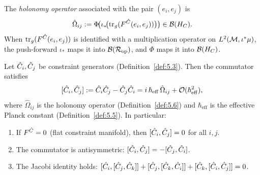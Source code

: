 \begin{definition}
\label{def:5.6}
The \emph{holonomy operator} associated with the pair $(e_i, e_j)$ is
\[
  \hat\Omega_{ij} := \Phi\!\bigl(
    \iota_*\!\bigl(\mathrm{tr}_g(F^{\hat{C}}(e_i, e_j))\bigr)
  \bigr) \in \mathcal{B}(H_C).
\]
When $\mathrm{tr}_g(F^{\hat{C}}(e_i, e_j))$ is identified with a
multiplication operator on $L^2(\mathcal{M}, \iota^*\mu)$, the push-forward
$\iota_*$ maps it into $\mathcal{B}(\mathcal{R}_{\mathrm{op}})$, and $\Phi$ maps it
into $\mathcal{B}(H_C)$.
\end{definition}

\begin{theorem}
\label{thm:5.1}
Let $\hat{C}_i, \hat{C}_j$ be constraint generators
\textup{(}Definition~\textup{\ref{def:5.3})}.  Then the commutator
satisfies
\[
  [\hat{C}_i, \hat{C}_j]
  := \hat{C}_i \hat{C}_j - \hat{C}_j \hat{C}_i
  = i\,\hbar_{\mathrm{eff}}\,\hat\Omega_{ij}
    + \mathcal{O}(\hbar_{\mathrm{eff}}^2),
\]
where $\hat\Omega_{ij}$ is the holonomy operator
\textup{(}Definition~\textup{\ref{def:5.6})} and
$\hbar_{\mathrm{eff}}$ is the effective Planck constant
\textup{(}Definition~\textup{\ref{def:5.5})}.  In particular:
\begin{enumerate}
  \item[\textup{(CR1)}] If $F^{\hat{C}} = 0$ \textup{(}flat constraint
    manifold\textup{)}, then $[\hat{C}_i, \hat{C}_j] = 0$ for all $i, j$.
  \item[\textup{(CR2)}] The commutator is antisymmetric:
    $[\hat{C}_i, \hat{C}_j] = -[\hat{C}_j, \hat{C}_i]$.
  \item[\textup{(CR3)}] The Jacobi identity holds:
    $[\hat{C}_i, [\hat{C}_j, \hat{C}_k]] + [\hat{C}_j, [\hat{C}_k, \hat{C}_i]]
    + [\hat{C}_k, [\hat{C}_i, \hat{C}_j]] = 0$.
\end{enumerate}
\end{theorem}

